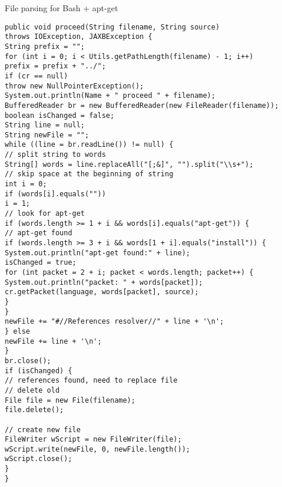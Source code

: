 
\begin{Listing}
\caption{File parsing for Bash + apt-get }
\label{lst:bash_apt_parse}
\begin{lstlisting}
public void proceed(String filename, String source)
throws IOException, JAXBException {
String prefix = "";
for (int i = 0; i < Utils.getPathLength(filename) - 1; i++)
prefix = prefix + "../";
if (cr == null)
throw new NullPointerException();
System.out.println(Name + " proceed " + filename);
BufferedReader br = new BufferedReader(new FileReader(filename));
boolean isChanged = false;
String line = null;
String newFile = "";
while ((line = br.readLine()) != null) {
// split string to words
String[] words = line.replaceAll("[;&]", "").split("\\s+");
// skip space at the beginning of string
int i = 0;
if (words[i].equals(""))
i = 1;
// look for apt-get
if (words.length >= 1 + i && words[i].equals("apt-get")) {
// apt-get found
if (words.length >= 3 + i && words[1 + i].equals("install")) {
System.out.println("apt-get found:" + line);
isChanged = true;
for (int packet = 2 + i; packet < words.length; packet++) {
System.out.println("packet: " + words[packet]);
cr.getPacket(language, words[packet], source);
}
}
newFile += "#//References resolver//" + line + '\n';
} else
newFile += line + '\n';
}
br.close();
if (isChanged) {
// references found, need to replace file
// delete old
File file = new File(filename);
file.delete();

// create new file
FileWriter wScript = new FileWriter(file);
wScript.write(newFile, 0, newFile.length());
wScript.close();
}
}
\end{lstlisting}
\end{Listing}

